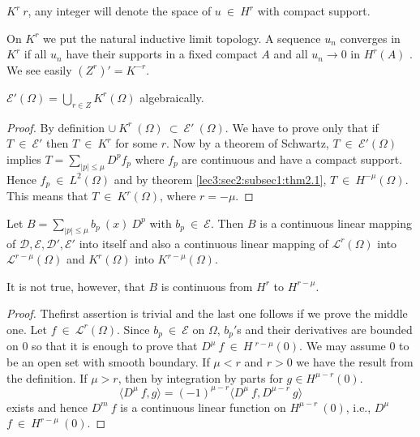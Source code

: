 \begin{definition}\label{lec13:sec8:subsec1:def8.2}%
  $K^r ~ r$, any integer will denote the space of $u ~ \in ~
  H^r$ with compact support. 
\end{definition}

On $K^r$ we put the natural inductive limit topology. A sequence $u_n$
converges in $K^r$ if all $u_n$ have their supports in a fixed compact
$A$ and all $u_n \rightarrow 0$ in $H^r (A)$ . We see easily $(Z^r)' =
K^{-r}$. 

\begin{proposition}\label{lec13:sec8:subsec1:prop8.1}%
  $\mathscr{E}'(\Omega) = \bigcup\limits_{r \in Z}K^r (\Omega)$
  algebraically. 
\end{proposition}

\begin{proof}%
By definition $\cup ~ K^r ~ (\Omega) ~ \subset ~ \mathscr{E}' ~
(\Omega)$. We have to prove only that if $T ~ \in ~
\mathscr{E}'$ then $T~ \in ~ K^r$ for some $r$. Now by a
theorem of Schwartz, $T ~ \in ~ \mathscr{E}' (\Omega)$ implies
$T = \sum\limits_{|p|\le \mu}D^p f_p$ where $f_p$ are continuous and
have a compact support. Hence $f_p ~ \in ~ L^2 (\Omega)$ and
by theorem \ref{lec3:sec2:subsec1:thm2.1}, $T ~ \in ~ H^{-\mu}(\Omega)$. This means that
$T ~ \in ~ K^r (\Omega)$, where $ r = - \mu$. 
\end{proof}

\begin{proposition}\label{lec13:sec8:subsec1:prop8.2}%
  Let $B = \sum\limits_{|p|\le \mu} b_p ~ (x) ~ D^p$ with $b_p ~
  \in ~ \mathscr{E}$. Then $B$ is a continuous linear mapping of
  $\mathscr{D}, \mathscr{E},\mathscr{D}',\mathscr{E}'$ into itself and
  also a continuous linear mapping of $\mathscr{L}^r (\Omega)$ into
  $\mathscr{L}^{r-\mu}(\Omega)$ and $K^{r}(\Omega)$ into
  $K^{r-\mu}(\Omega)$. 
\end{proposition}

\begin{remark*}
  It is not true, however, that $B$ is continuous from $H^r$ to $H^{r-\mu}$.
\end{remark*}

\begin{proof}%
  The\pageoriginale first assertion is trivial and the last one follows if we prove the
  middle one. Let $f ~ \in ~ \mathscr{L}^r(\Omega)$. Since $b_p
  ~ \in ~ \mathscr{E}$ on $\Omega$, $b_p'$s and their
  derivatives are bounded on $0$ so that it is enough to prove that
  $D^\mu ~ f ~ \in ~ H ~ ^{r-\mu}(0)$.  We may assume $0$ to be
  an open set with smooth boundary. If $\mu < r$ and $r > 0$ we have the
  result from the definition. If $\mu > r$, then by integration by parts
  for $g \in H^{\mu -r}(0)$. 
  $$
  \langle D^{\mu} ~ f, g \rangle = (-1)^{\mu - r} \langle D^\mu ~ f,
  D^{\mu - r} ~ g \rangle 
  $$
  exists and hence $D^m ~f $  is a continuous linear function on $H^{\mu
    - r} ~ (0)$, i.e., $D^\mu$  $f ~ \in ~ H^{r-\mu} ~ (0)$. 
\end{proof}

